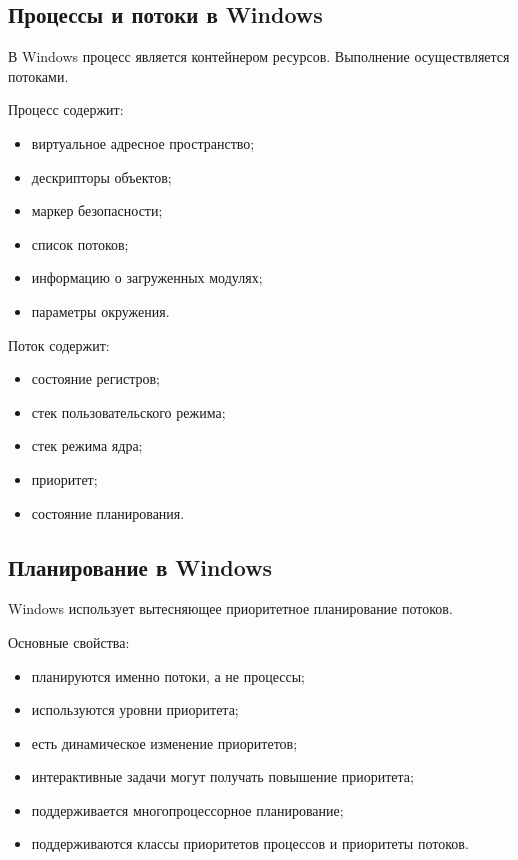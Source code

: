 \documentclass[12pt,a4paper]{article}
\begin{document}
\subsection{Процессы и потоки в Windows}

В Windows процесс является контейнером ресурсов. Выполнение осуществляется потоками.

Процесс содержит:

\begin{itemize}
    \item виртуальное адресное пространство;
    \item дескрипторы объектов;
    \item маркер безопасности;
    \item список потоков;
    \item информацию о загруженных модулях;
    \item параметры окружения.
\end{itemize}

Поток содержит:

\begin{itemize}
    \item состояние регистров;
    \item стек пользовательского режима;
    \item стек режима ядра;
    \item приоритет;
    \item состояние планирования.
\end{itemize}

\subsection{Планирование в Windows}

Windows использует вытесняющее приоритетное планирование потоков.

Основные свойства:

\begin{itemize}
    \item планируются именно потоки, а не процессы;
    \item используются уровни приоритета;
    \item есть динамическое изменение приоритетов;
    \item интерактивные задачи могут получать повышение приоритета;
    \item поддерживается многопроцессорное планирование;
    \item поддерживаются классы приоритетов процессов и приоритеты потоков.
\end{itemize}
\end{document}
